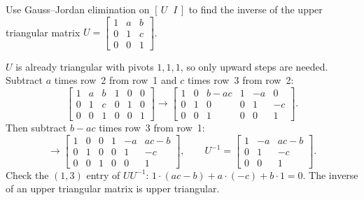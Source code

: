 \begin{exercise}\label{ex:u04-Uinv}
Use Gauss--Jordan elimination on $[\,U\;\;I\,]$ to find the inverse of the upper triangular
matrix $U=\begin{bmatrix} 1&a&b\\ 0&1&c\\ 0&0&1\end{bmatrix}$.
\end{exercise}
\begin{solution}
$U$ is already triangular with pivots $1,1,1$, so only upward steps are needed. Subtract $a$
times row~2 from row~1 and $c$ times row~3 from row~2:
\[
  \left[\begin{array}{ccc|ccc} 1&a&b&1&0&0\\ 0&1&c&0&1&0\\ 0&0&1&0&0&1\end{array}\right]
  \to
  \left[\begin{array}{ccc|ccc} 1&0&b-ac&1&-a&0\\ 0&1&0&0&1&-c\\ 0&0&1&0&0&1\end{array}\right].
\]
Then subtract $b-ac$ times row~3 from row~1:
\[
  \to
  \left[\begin{array}{ccc|ccc} 1&0&0&1&-a&ac-b\\ 0&1&0&0&1&-c\\ 0&0&1&0&0&1\end{array}\right],
  \qquad
  U^{-1}=\begin{bmatrix} 1&-a&ac-b\\ 0&1&-c\\ 0&0&1\end{bmatrix}.
\]
Check the $(1,3)$ entry of $UU^{-1}$: $1\cdot(ac-b)+a\cdot(-c)+b\cdot1=0$. The inverse of an
upper triangular matrix is upper triangular.
\end{solution}

